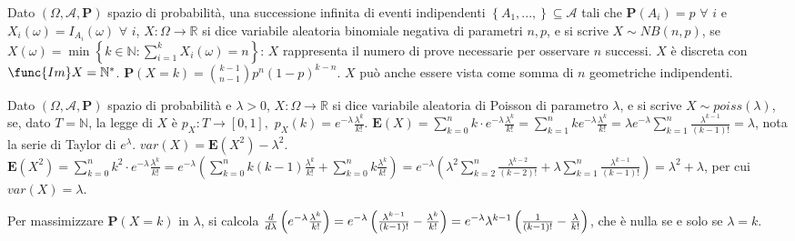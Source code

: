 \documentclass{article}
\begin{document}
\begin{description}
\item[E7] Dato $\left( \Omega ,\mathcal{A},\mathbf{P}\right) $ spazio di
probabilit\`{a}, una successione infinita di eventi indipendenti $\left\{
A_{1},...,\right\} \subseteq \mathcal{A}$ tali che $\mathbf{P}\left(
A_{i}\right) =p$ $\forall $ $i$ e $X_{i}\left( \omega \right)
=I_{A_{i}}\left( \omega \right) $ $\forall $ $i$, $X:\Omega \rightarrow 
\mathbb{R}
$ si dice variabile aleatoria binomiale negativa di parametri $n,p$, e si
scrive $X\sim NB\left( n,p\right) $, se $X\left( \omega \right) =\min
\left\{ k\in 
\mathbb{N}
:\sum_{i=1}^{k}X_{i}\left( \omega \right) =n\right\} $: $X$ rappresenta il
numero di prove necessarie per osservare $n$ successi. $X$ \`{e} discreta
con $\func{Im}X=%
\mathbb{N}
^{\ast }$. $\mathbf{P}\left( X=k\right) =\binom{k-1}{n-1}p^{n}\left(
1-p\right) ^{k-n}$. $X$ pu\`{o} anche essere vista come somma di $n$
geometriche indipendenti.

\item[E7] Dato $\left( \Omega ,\mathcal{A},\mathbf{P}\right) $ spazio di
probabilit\`{a} e $\lambda >0$, $X:\Omega \rightarrow 
\mathbb{R}
$ si dice variabile aleatoria di Poisson di parametro $\lambda $, e si
scrive $X\sim poiss\left( \lambda \right) $, se, dato $T=%
\mathbb{N}
$, la legge di $X$ \`{e} $p_{X}:T\rightarrow \left[ 0,1\right] ,$ $%
p_{X}\left( k\right) =e^{-\lambda }\frac{\lambda ^{k}}{k!}$. $\mathbf{E}%
\left( X\right) =\sum_{k=0}^{n}k\cdot e^{-\lambda }\frac{\lambda ^{k}}{k!}%
=\sum_{k=1}^{n}ke^{-\lambda }\frac{\lambda ^{k}}{k!}=\lambda e^{-\lambda
}\sum_{k=1}^{n}\frac{\lambda ^{k-1}}{\left( k-1\right) !}=\lambda $, nota la
serie di Taylor di $e^{\lambda }$. $var\left( X\right) =\mathbf{E}\left(
X^{2}\right) -\lambda ^{2}$. $\mathbf{E}\left( X^{2}\right)
=\sum_{k=0}^{n}k^{2}\cdot e^{-\lambda }\frac{\lambda ^{k}}{k!}=e^{-\lambda
}\left( \sum_{k=0}^{n}k\left( k-1\right) \frac{\lambda ^{k}}{k!}%
+\sum_{k=0}^{n}k\frac{\lambda ^{k}}{k!}\right) =e^{-\lambda }\left( \lambda
^{2}\sum_{k=2}^{n}\frac{\lambda ^{k-2}}{\left( k-2\right) !}+\lambda
\sum_{k=1}^{n}\frac{\lambda ^{k-1}}{\left( k-1\right) !}\right) =\lambda
^{2}+\lambda $, per cui $var\left( X\right) =\lambda $.

\item Per massimizzare $\mathbf{P}\left( X=k\right) $ in $\lambda $, si
calcola $\frac{d}{d\lambda }\left( e^{-\lambda }\frac{\lambda ^{k}}{k!}%
\right) =e^{-\lambda }\left( \frac{\lambda ^{k-1}}{\left( k-1\right) !}-%
\frac{\lambda ^{k}}{k!}\right) =e^{-\lambda }\lambda ^{k-1}\left( \frac{1}{%
\left( k-1\right) !}-\frac{\lambda }{k!}\right) $, che \`{e} nulla se e solo
se $\lambda =k$.


\end{description}
\end{document}
